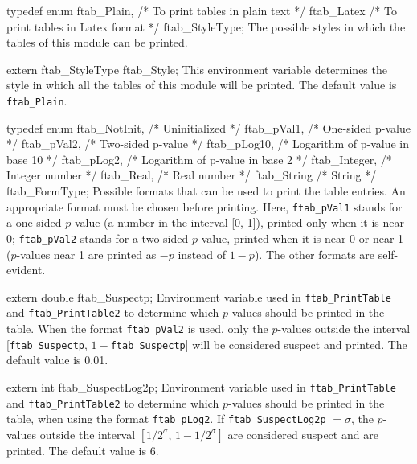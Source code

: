\code

typedef enum {
   ftab_Plain,                /* To print tables in plain text */
   ftab_Latex                 /* To print tables in Latex format */
} ftab_StyleType;
\endcode
 \tab The possible styles in which the tables of this module can be printed.
\endtab
\code


extern ftab_StyleType ftab_Style;
\endcode
\tab This environment variable determines the style in which all the tables
  of this module will be printed. The default value is {\tt ftab\_Plain}.
\endtab
\mycode


typedef enum {
   ftab_NotInit,              /* Uninitialized */
   ftab_pVal1,                /* One-sided p-value */
   ftab_pVal2,                /* Two-sided p-value */
   ftab_pLog10,               /* Logarithm of p-value in base 10 */
   ftab_pLog2,                /* Logarithm of p-value in base 2 */
   ftab_Integer,              /* Integer number */
   ftab_Real,                 /* Real number */
   ftab_String                /* String */
} ftab_FormType;
\myendcode
 \tab Possible formats that can be used to print the table entries.
  An appropriate format must be chosen before printing.
  Here, {\tt ftab\_pVal1}
  stands for a one-sided $p$-value (a number in the interval [0, 1]),
  printed only when it is near 0; {\tt ftab\_pVal2}  stands for a
  two-sided $p$-value, printed  when it is near 0 or near 1
  ($p$-values near 1 are printed as $-p$ instead of $1 -p$).
  The other formats are self-evident.
 \endtab
\code


extern double ftab_Suspectp;
\endcode
 \tab  Environment variable
   used in {\tt ftab\_PrintTable} and  {\tt ftab\_PrintTable2} to determine
   which $p$-values should be printed in the table.
   When the format {\tt ftab\_pVal2} is used, only the
   $p$-values outside the interval [{\tt ftab\_Suspectp},
    $1 - {}${\tt ftab\_Suspectp}] will be considered suspect and printed.
   The default value is 0.01.
 \endtab
\code


extern int ftab_SuspectLog2p;
\endcode
 \tab  Environment variable used in {\tt ftab\_PrintTable}  and
   {\tt ftab\_PrintTable2}  to determine which $p$-values should be printed
   in the table, when using the format {\tt ftab\_pLog2}.
   If {\tt ftab\_SuspectLog2p} $= \sigma$, the $p$-values
   outside the interval $[1/{2^\sigma},\, 1-1/{2^\sigma}]$ are
   considered suspect and are printed.
   The default value is 6.
 \endtab
\code


